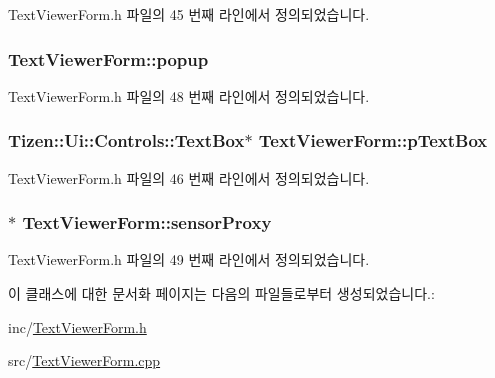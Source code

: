 Text\+Viewer\+Form.\+h 파일의 45 번째 라인에서 정의되었습니다.

\hypertarget{class_text_viewer_form_afd589dc0e964f2615dfc9414ffffdb44}{
\subsubsection[{popup}]{ Text\+Viewer\+Form\+::popup\hspace{0.3cm}{\ttfamily [protected]}}}\label{class_text_viewer_form_afd589dc0e964f2615dfc9414ffffdb44}


Text\+Viewer\+Form.\+h 파일의 48 번째 라인에서 정의되었습니다.

\hypertarget{class_text_viewer_form_af19e24e33e90149750d852ce35da7b38}{
\subsubsection[{p\+Text\+Box}]{\setlength{\rightskip}{0pt plus 5cm}Tizen\+::\+Ui\+::\+Controls\+::\+Text\+Box$\ast$ Text\+Viewer\+Form\+::p\+Text\+Box\hspace{0.3cm}{\ttfamily [protected]}}}\label{class_text_viewer_form_af19e24e33e90149750d852ce35da7b38}


Text\+Viewer\+Form.\+h 파일의 46 번째 라인에서 정의되었습니다.

\hypertarget{class_text_viewer_form_a5235dd45fbd19e2a6c64949ee9803829}{
\subsubsection[{sensor\+Proxy}]{$\ast$ Text\+Viewer\+Form\+::sensor\+Proxy\hspace{0.3cm}{\ttfamily [protected]}}}\label{class_text_viewer_form_a5235dd45fbd19e2a6c64949ee9803829}


Text\+Viewer\+Form.\+h 파일의 49 번째 라인에서 정의되었습니다.



이 클래스에 대한 문서화 페이지는 다음의 파일들로부터 생성되었습니다.\+:\begin{DoxyCompactItemize}
\item 
inc/\hyperlink{_text_viewer_form_8h}{Text\+Viewer\+Form.\+h}\item 
src/\hyperlink{_text_viewer_form_8cpp}{Text\+Viewer\+Form.\+cpp}\end{DoxyCompactItemize}
